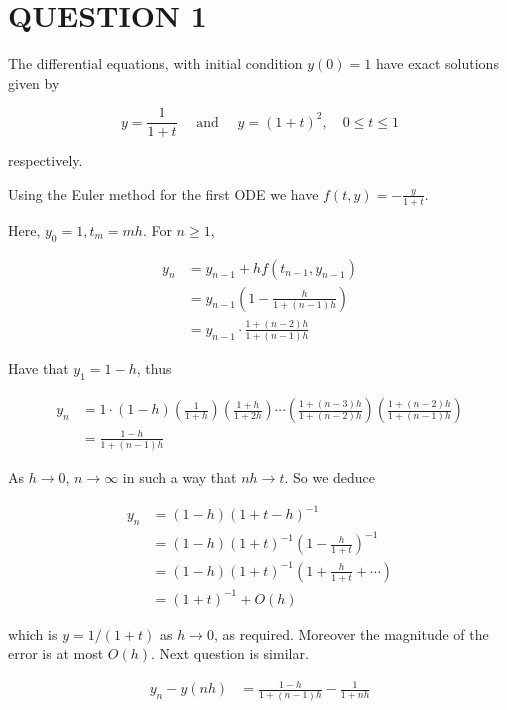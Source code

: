\documentclass[a4paper]{article}
\begin{document}
	
\maketitle

\section{QUESTION 1}

The differential equations, with initial condition $ y(0)= 1 $ have exact solutions given by

\[ y = \frac{1}{1+t} \quad \text{ and } \quad y = (1 + t)^{2}, \quad 0 \leq t \leq 1\]

respectively.

Using the Euler method for the first ODE we have $ f(t,y) = -\frac{y}{1+t} $.

Here, $ y_{0} = 1, t_{m} = mh$. For $ n \geq 1 $,

\begin{align*}
y_{n} & = y_{n-1} + h f(t_{n-1},y_{n-1}) \\
& = y_{n-1} \left(  1 - \frac{h}{1+(n-1)h} \right)  \\
& = y_{n-1} \cdot \frac{1 + (n-2)h}{1 + (n-1)h} 
\end{align*}

Have that $ y_{1} = 1 - h $, thus

\begin{align*}
y_{n} & =  1 \cdot (1-h) \left( \frac{1}{1+h} \right)\left( \frac{1+h}{1+2h} \right) \cdots \left(  \frac{1 + (n-3)h}{1 + (n-2)h}  \right)   \left( \frac{1 + (n-2)h}{1 + (n-1)h}  \right)  \\
& = \frac{1-h}{1 + (n-1)h}
\end{align*}

As $  h \to 0 $, $ n \to \infty $ in such a way that $ nh \to t $. So we deduce 

\begin{align*}
y_{n }& =(1-h)(1+t-h)^{-1} \\
& = (1-h)(1+t)^{-1}\left(  1 - \frac{h}{1+t} \right)^{-1} \\
& =  (1-h)(1+t)^{-1}\left(  1 + \frac{h}{1+t} + \cdots \right) \\
& = (1+t)^{-1} + O(h)
\end{align*}

which is $ y = 1/(1+t) $ as $ h \to 0 $, as required. Moreover the magnitude of the error is at most $ O(h) $. Next question is similar. 

\begin{align*}
y_{n} - y(nh) & = \frac{1-h}{1 + (n-1)h} - \frac{1}{1+nh} \\
\end{align*}
\end{document}
